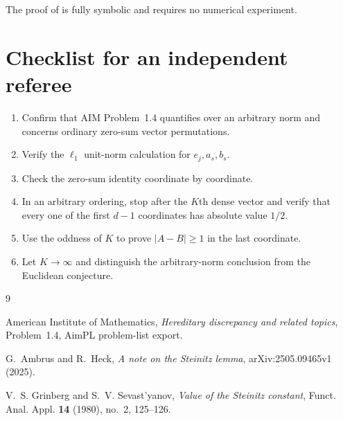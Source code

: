 \documentclass[10pt,reqno]{amsart}
\theoremstyle{definition}
\begin{document}
The proof of  is fully symbolic and requires no numerical experiment.

\appendix

\section{Checklist for an independent referee}

\begin{enumerate}
  \item Confirm that AIM Problem~1.4 quantifies over an arbitrary norm and concerns ordinary zero-sum vector permutations.
  \item Verify the $\ell_1$ unit-norm calculation for $e_j,a_s,b_s$.
  \item Check the zero-sum identity coordinate by coordinate.
  \item In an arbitrary ordering, stop after the $K$th dense vector and verify that every one of the first $d-1$ coordinates has absolute value $1/2$.
  \item Use the oddness of $K$ to prove $|A-B|\geq1$ in the last coordinate.
  \item Let $K\to\infty$ and distinguish the arbitrary-norm conclusion from the Euclidean conjecture.
\end{enumerate}

\begin{thebibliography}{9}

American Institute of Mathematics,
\emph{Hereditary discrepancy and related topics}, Problem~1.4,
AimPL problem-list export.

G.~Ambrus and R.~Heck,
\emph{A note on the Steinitz lemma},
arXiv:2505.09465v1 (2025).

V.~S. Grinberg and S.~V. Sevast'yanov,
\emph{Value of the Steinitz constant},
Funct. Anal. Appl. \textbf{14} (1980), no.~2, 125--126.

\end{thebibliography}
\end{document}
